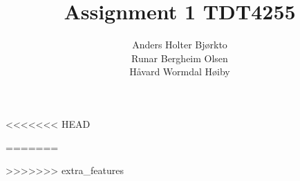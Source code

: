 \documentclass[a4paper, 10pt, titlepage]{article}
\title{Assignment 1 TDT4255}
\author{Anders Holter Bjørkto\\
Runar Bergheim Olsen\\
Håvard Wormdal Høiby}
\begin{document}
  \maketitle
	\newpage
<<<<<<< HEAD

	
	\tableofcontents
	
	
	
	
	
	
	
=======
        
        \tableofcontents
        
        
        
        
        
        
>>>>>>> extra_features
\end{document}
